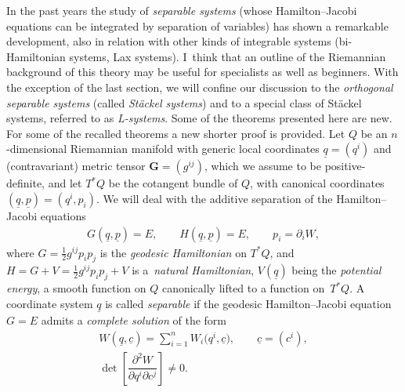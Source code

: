 \documentclass[pdftex]{sigma}
\def\bs{\boldsymbol}
\numberwithin{equation}{section}
\begin{document}
In the past years the study of {\it separable systems} (whose Hamilton--Jacobi equations can be integrated by separation of variables) has shown a remarkable development, also in relation with other kinds of integrable systems (bi-Hamiltonian systems, Lax systems). I~think that an outline of the Riemannian background of this theory may be useful for specialists as well as beginners. With the exception of the last section, we will conf\/ine our discussion to the {\it orthogonal separable systems} (called {\it St\"ackel systems}) and to a special class of St\"ackel systems, referred to as {\it L-systems}. Some of the theorems presented here are new. For some of the recalled theorems a new shorter proof is provided.
Let $Q$ be an $n$-dimensional Riemannian manifold with generic local coordinates $\underline q=(q^i)$ and (contravariant) metric tensor $\bs G=(g^{ij})$, which we assume to be positive-def\/inite, and let $T^*Q$ be the cotangent bundle of $Q$, with canonical coordinates $(\underline q,\underline p)=(q^i,p_i)$. We will deal with the additive separation of the Hamilton--Jacobi equations
\begin{gather*}
G(\underline q,\underline p)=E, \qquad
H(\underline q,\underline p)=E, \qquad  p_i=\partial_iW,
\end{gather*}
where $G=\tfrac 12 g^{ij} p_ip_j$ is the {\it geodesic Hamiltonian} on $T^*Q$, and   $H=G+V=\tfrac 12 g^{ij} p_ip_j+V$ is a~{\it natural Hamiltonian}, $V(\underline q)$  being the {\it potential energy}, a smooth function on $Q$ canonically lifted to a function on~$T^*Q$. A coordinate system $\underline q$ is called {\it separable} if the geodesic Hamilton--Jacobi equation $G=E$ admits a {\it complete solution} of the form
\begin{subequations}\label{(1.1)}
\begin{gather}
W(\underline q,\underline c)=\sum _{i=1}^n W_i\big(q^i,\underline c\big),\qquad \underline c=(c^i), \label{(1.1)1}\\
\det\left[\dfrac{\partial^2W}{\partial q^i\partial c^j}\right]\neq 0.\label{(1.1)2}
\end{gather}
\end{subequations}
\end{document}
